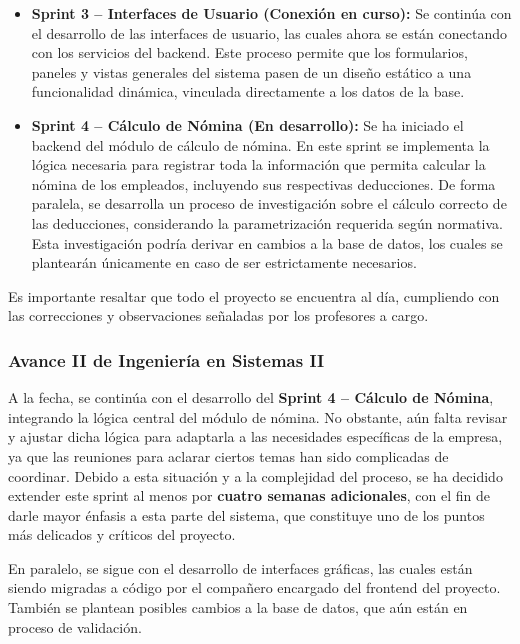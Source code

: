 \begin{itemize}
	\item \textbf{Sprint 3 – Interfaces de Usuario (Conexión en curso):}
	      Se continúa con el desarrollo de las interfaces de usuario, las cuales ahora se están conectando con los servicios del backend. Este proceso permite que los formularios, paneles y vistas generales del sistema pasen de un diseño estático a una funcionalidad dinámica, vinculada directamente a los datos de la base.

	\item \textbf{Sprint 4 – Cálculo de Nómina (En desarrollo):}
	      Se ha iniciado el backend del módulo de cálculo de nómina. En este sprint se implementa la lógica necesaria para registrar toda la información que permita calcular la nómina de los empleados, incluyendo sus respectivas deducciones. De forma paralela, se desarrolla un proceso de investigación sobre el cálculo correcto de las deducciones, considerando la parametrización requerida según normativa.
	      Esta investigación podría derivar en cambios a la base de datos, los cuales se plantearán únicamente en caso de ser estrictamente necesarios.
\end{itemize}

Es importante resaltar que todo el proyecto se encuentra al día, cumpliendo con las correcciones y observaciones señaladas por los profesores a cargo.

\subsubsection{Avance II de Ingeniería en Sistemas II}

A la fecha, se continúa con el desarrollo del \textbf{Sprint 4 – Cálculo de Nómina}, integrando la lógica central del módulo de nómina. No obstante, aún falta revisar y ajustar dicha lógica para adaptarla a las necesidades específicas de la empresa, ya que las reuniones para aclarar ciertos temas han sido complicadas de coordinar. Debido a esta situación y a la complejidad del proceso, se ha decidido extender este sprint al menos por \textbf{cuatro semanas adicionales}, con el fin de darle mayor énfasis a esta parte del sistema, que constituye uno de los puntos más delicados y críticos del proyecto.

En paralelo, se sigue con el desarrollo de interfaces gráficas, las cuales están siendo migradas a código por el compañero encargado del frontend del proyecto. También se plantean posibles cambios a la base de datos, que aún están en proceso de validación.

